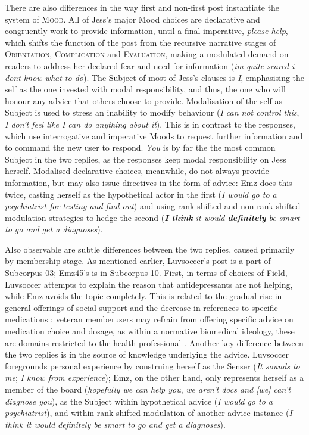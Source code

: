 \documentclass{article}
\renewcommand{\cite}{\parencite}
\begin{document}
There are also differences in the way first and non-first post instantiate the system of \textsc{Mood}. All of Jess's major Mood choices are declarative and congruently work to provide information, until a final imperative, \emph{please help}, which shifts the function of the post from the recursive narrative stages of \textsc{Orientation}, \textsc{Complication} and \textsc{Evaluation}, making a modulated demand on readers to address her declared fear and need for information (\emph{im quite scared i dont know what to do}). The Subject of most of Jess's clauses is \emph{I}, emphasising the self as the one invested with modal responsibility, and thus, the one who will honour any advice that others choose to provide. Modalisation of the self as Subject is used to stress an inability to modify behaviour (\emph{I can not control this}, \emph{I don't feel like I can do anything about it}). This is in contrast to the responses, which use interrogative and imperative Moods to request further information and to command the new user to respond. \emph{You} is by far the the most common Subject in the two replies, as the responses keep modal responsibility on Jess herself. Modalised declarative choices, meanwhile, do not always provide information, but may also issue directives in the form of advice: Emz does this twice, casting herself as the hypothetical actor in the first (\emph{I would go to a psychiatrist for testing and find out}) and using rank-shifted and non-rank-shifted modulation strategies to hedge the second (\emph{\textbf{I think} it would \textbf{definitely} be smart to go and get a diagnoses}).

Also observable are subtle differences between the two replies, caused primarily by membership stage. As mentioned earlier, Luvsoccer's post is a part of Subcorpus 03; Emz45's is in Subcorpus 10. First, in terms of choices of Field, Luvsoccer attempts to explain the reason that antidepressants are not helping, while Emz avoids the topic completely. This is related to the gradual rise in general offerings of social support and the decrease in references to specific medications \cite{wang_stay_2012}: veteran member{users} may refrain from offering specific advice on medication choice and dosage, as within a normative biomedical ideology, these are domains restricted to the health professional \cite{vayreda_social_2009}. Another key difference between the two replies is in the source of knowledge underlying the advice. Luvsoccer foregrounds personal experience by construing herself as the Senser (\emph{It sounds to me}; \emph{I know from experience}); Emz, on the other hand, only represents herself as a member of the board (\emph{hopefully we can help you}, \emph{we aren't docs and [we] can't diagnose you}), as the Subject within hypothetical advice (\emph{I would go to a psychiatrist}), and within rank-shifted modulation of another advice instance (\emph{I think it would definitely be smart to go and get a diagnoses}). 
\end{document}
